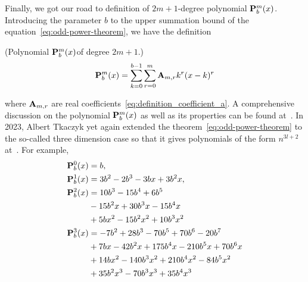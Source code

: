 Finally, we got our road to definition of $2m+1$-degree polynomial ${\mathbf{P}}\sp{m} \sb{b}(x)$.
Introducing the parameter $b$ to the upper summation bound of the equation~\eqref{eq:odd-power-theorem},
we have the definition
\begin{defn} (Polynomial ${\mathbf{P}}\sp{m} \sb{b}(x) $of degree $2m+1$.)
    \begin{equation}
        {\mathbf{P}}\sp{m} \sb{b}(x) = \sum_{k=0}^{b-1} \sum_{r=0}^{m} {\mathbf{A}} \sb{m,r} k^r(x-k)^r
        \label{eq:definition_polynomial_p}
    \end{equation}
\end{defn}
where ${\mathbf{A}} \sb{m,r}$ are real coefficients~\eqref{eq:definition_coefficient_a}.
A comprehensive discussion on the polynomial ${\mathbf{P}}\sp{m} \sb{b}(x)$ as well as its properties can be found at~\cite{kolosov2016link}.
In 2023, Albert Tkaczyk yet again extended the theorem~\eqref{eq:odd-power-theorem} to the so-called three dimension case
so that it gives polynomials of the form $n^{3l+2}$ at~\cite{albert_tkaczyk_2023_8371454}.
For example,
\begin{align*}
    {\mathbf{P}}\sp{0} \sb{b}(x)
    &=b, \\
    {\mathbf{P}}\sp{1} \sb{b}(x)
    &=3 b^2 - 2 b^3 - 3 b x + 3 b^2 x, \\
    {\mathbf{P}}\sp{2} \sb{b}(x)
    &=10 b^3 - 15 b^4 + 6 b^5 \\
    &- 15 b^2 x + 30 b^3 x - 15 b^4 x \\
    &+ 5 b x^2 - 15 b^2 x^2 + 10 b^3 x^2 \\
    {\mathbf{P}}\sp{3} \sb{b}(x)
    &=-7 b^2 + 28 b^3 - 70 b^5 + 70 b^6 - 20 b^7 \\
    &+ 7 b x - 42 b^2 x + 175 b^4 x - 210 b^5 x + 70 b^6 x \\
    &+ 14 b x^2 - 140 b^3 x^2 + 210 b^4 x^2 - 84 b^5 x^2 \\
    &+ 35 b^2 x^3 - 70 b^3 x^3 + 35 b^4 x^3
\end{align*}
